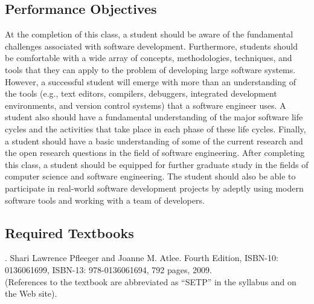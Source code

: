 \subsection*{Performance Objectives}

At the completion of this class, a student should be aware of the fundamental challenges associated with software
development.  Furthermore, students should be comfortable with a wide array of concepts, methodologies, techniques, and
tools that they can apply to the problem of developing large software systems.  However, a successful student will
emerge with more than an understanding of the tools (e.g., text editors, compilers, debuggers, integrated development
environments, and version control systems) that a software engineer uses.  A student also should have a fundamental
understanding of the major software life cycles and the activities that take place in each phase of these life cycles.
Finally, a student should have a basic understanding of some of the current research and the open research questions in
the field of software engineering.  After completing this class, a student should be equipped for further graduate study
in the fields of computer science and software engineering.  The student should also be able to participate in
real-world software development projects by adeptly using modern software tools and working with a team of developers.

\subsection*{Required Textbooks}


. Shari Lawrence Pfleeger and Joanne M. Atlee.
Fourth Edition, ISBN-10: 0136061699, ISBN-13: 978-0136061694, 792 pages, 2009. \\
(References to the textbook are abbreviated as ``SETP'' in the syllabus and on the Web site).


